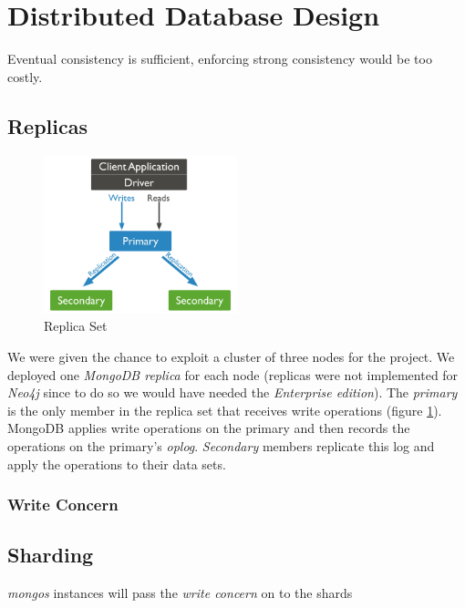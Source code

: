 \section{Distributed Database Design}
Eventual consistency is sufficient, enforcing strong consistency would be too costly. 
\subsection{Replicas}
\begin{figure}[t]
	\centering
	\includegraphics[width=0.5\textwidth]{chapter3/img/replica.png}
	\caption{Replica Set}
	\label{fig:replica}
\end{figure}
We were given the chance to exploit a cluster of three nodes for the project. We deployed one \emph{MongoDB replica} for each node (replicas were not implemented for \emph{Neo4j} since to do so we would have needed the \emph{Enterprise edition}). 
The \emph{primary} is the only member in the replica set that receives write operations (figure \ref{fig:replica}). MongoDB applies write operations on the primary and then records the operations on the primary's \emph{oplog}. \emph{Secondary} members replicate this log and apply the operations to their data sets.
\subsubsection{Write Concern}

\subsection{Sharding}
\emph{mongos} instances will pass the \emph{write concern} on to the shards
